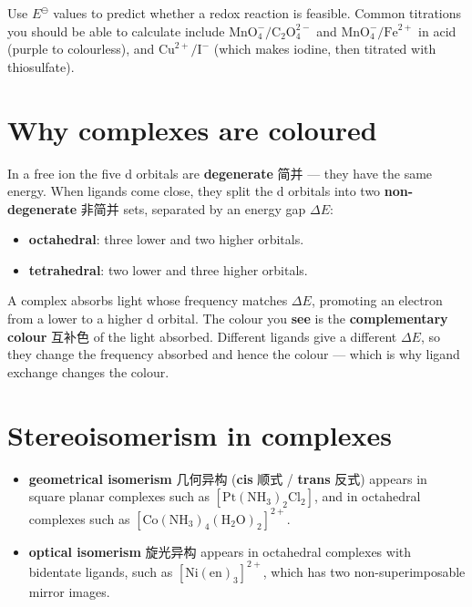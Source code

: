 \documentclass[11pt]{article}
\begin{document}
Use $E^{\ominus}$ values to predict whether a redox reaction is feasible. Common titrations you should be able to calculate include $\text{MnO}_4^-/\text{C}_2\text{O}_4^{2-}$ and $\text{MnO}_4^-/\text{Fe}^{2+}$ in acid (purple to colourless), and $\text{Cu}^{2+}/\text{I}^-$ (which makes iodine, then titrated with thiosulfate).

\section*{Why complexes are coloured}

In a free ion the five d orbitals are \textbf{degenerate} 简并 — they have the same energy. When ligands come close, they split the d orbitals into two \textbf{non-degenerate} 非简并 sets, separated by an energy gap $\Delta E$:

\begin{itemize}
\item \textbf{octahedral}: three lower and two higher orbitals.

\item \textbf{tetrahedral}: two lower and three higher orbitals.

\end{itemize}

A complex absorbs light whose frequency matches $\Delta E$, promoting an electron from a lower to a higher d orbital. The colour you \textbf{see} is the \textbf{complementary colour} 互补色 of the light absorbed. Different ligands give a different $\Delta E$, so they change the frequency absorbed and hence the colour — which is why ligand exchange changes the colour.

\section*{Stereoisomerism in complexes}

\begin{itemize}
\item \textbf{geometrical isomerism} 几何异构 (\textbf{cis} 顺式 / \textbf{trans} 反式) appears in square planar complexes such as $[\text{Pt}(\text{NH}_3)_2\text{Cl}_2]$, and in octahedral complexes such as $[\text{Co}(\text{NH}_3)_4(\text{H}_2\text{O})_2]^{2+}$.

\item \textbf{optical isomerism} 旋光异构 appears in octahedral complexes with bidentate ligands, such as $[\text{Ni}(\text{en})_3]^{2+}$, which has two non-superimposable mirror images.

\end{itemize}
\end{document}
